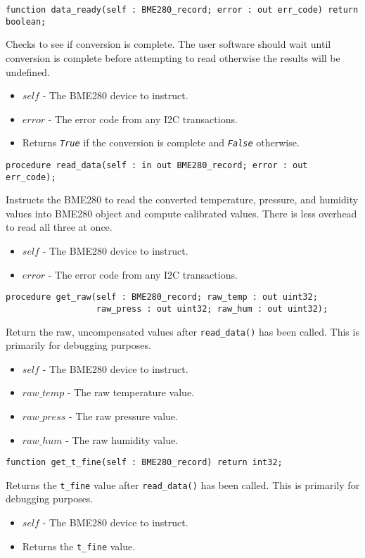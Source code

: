 \documentclass[10pt, openany]{book}
\newcommand{\package}[1]{\texttt{#1}}
\newcommand{\function}[1]{\texttt{#1}}
\newcommand{\constant}[1]{\emph{\texttt{#1}}}
\begin{document}
\begin{lstlisting}
function data_ready(self : BME280_record; error : out err_code) return boolean;
\end{lstlisting}
Checks to see if conversion is complete.  The user software should wait until conversion is complete before attempting to read otherwise the results will be undefined.
\begin{itemize}
  \item $self$ - The BME280 device to instruct.
  \item $error$ - The error code from any I2C transactions.
  \item Returns \constant{True} if the conversion is complete and \constant{False} otherwise.
\end{itemize}

\begin{lstlisting}
procedure read_data(self : in out BME280_record; error : out err_code);
\end{lstlisting}
Instructs the BME280 to read the converted temperature, pressure, and humidity values into BME280 object and compute calibrated values.  There is less overhead to read all three at once.
\begin{itemize}
  \item $self$ - The BME280 device to instruct.
  \item $error$ - The error code from any I2C transactions.
\end{itemize}

\begin{lstlisting}
procedure get_raw(self : BME280_record; raw_temp : out uint32;
                  raw_press : out uint32; raw_hum : out uint32);
\end{lstlisting}
Return the raw, uncompensated values after \function{read\_data()} has been called.  This is primarily for debugging purposes.
\begin{itemize}
  \item $self$ - The BME280 device to instruct.
  \item $raw\_temp$ - The raw temperature value.
  \item $raw\_press$ - The raw pressure value.
  \item $raw\_hum$ - The raw humidity value.
\end{itemize}

\begin{lstlisting}
function get_t_fine(self : BME280_record) return int32;
\end{lstlisting}
Returns the \package{t\_fine} value after \function{read\_data()} has been called.  This is primarily for debugging purposes.
\begin{itemize}
  \item $self$ - The BME280 device to instruct.
  \item Returns the \package{t\_fine} value.
\end{itemize}
\end{document}
